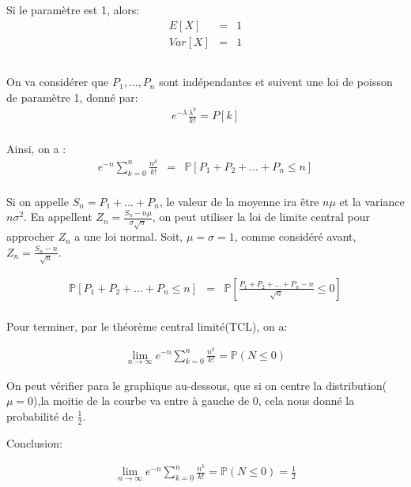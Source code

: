 \documentclass[a4paper]{article}
\begin{document}
Si le paramètre est 1, alors:
\begin{eqnarray*}
  E[X]&=& 1\\
  Var[X] &=& 1
\end{eqnarray*}

\subsection{}

On va considérer que $P_1,...,P_n$ sont indépendantes et suivent une loi de poisson de paramètre 1, donné par:
\begin{eqnarray*}
  e^{-\lambda}\frac{\lambda^k}{k!}=P[k]\\
\end{eqnarray*}

Ainsi, on a :
\begin{eqnarray*}
  e^{-n}\sum_{k=0}^n\frac{n^k}{k!}&=&\mathbb{P}[P_1+P_2+...+P_n\leq n]\\
\end{eqnarray*}

Si on appelle $S_n=P_1+\dots+P_n$, le valeur de la moyenne ira être $n\mu$ et la
variance  $n\sigma^2$. En  appellent $Z_n=\frac{S_n-n\mu}{\sigma  \sqrt{n}}$, on
peut  utiliser  la  loi  de  limite  central pour  approcher  $Z_n$  a  une  loi
normal. Soit, $\mu=\sigma=1$, comme considéré avant,$Z_n=\frac{S_n-n}{\sqrt{n}}$.

\begin{eqnarray*}
 \mathbb{P}[P_1+P_2+...+P_n\leq n]&=& \mathbb{P}[\frac{P_1+P_2+...+P_n-n}{\sqrt{n}} \leq 0] \\
\end{eqnarray*}

Pour terminer, par le théorème central limité(TCL), on a:

\begin{eqnarray*}
 \lim_{n\rightarrow\infty} e^{-n}\sum_{k=0}^n\frac{n^k}{k!}=\mathbb{P}(N\leq 0)
\end{eqnarray*}

On  peut   vérifier  para  le  graphique   au-dessous,  que  si   on  centre  la
distribution($\mu=0$),la moitie de  la courbe va entre à gauche  de 0, cela nous
donné la probabilité de $\frac{1}{2}$.

\begin{center}
\end{center}

Conclusion:

\begin{eqnarray*}
 \lim_{n\rightarrow\infty} e^{-n}\sum_{k=0}^n\frac{n^k}{k!}=\mathbb{P}(N\leq 0)=\frac{1}{2}
\end{eqnarray*}
\end{document}
